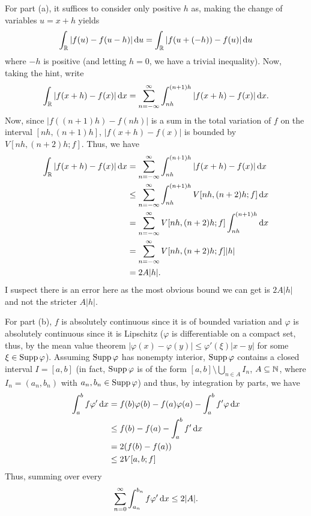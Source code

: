 \begin{solution}
  For part (a), it suffices to consider only positive \(h\) as, making the
  change of variables \(u=x+h\) yields
  \[
    \int_{\mathbb{R}} |f(u)-f(u-h)|\mathop{}\!\mathrm{d} u=
    \int_{\mathbb{R}} |f(u+(-h))-f(u)|\mathop{}\!\mathrm{d} u
  \]
  where \(-h\) is positive (and letting \(h=0\), we have a trivial
  inequality). Now, taking the hint, write
  \[
    \int_{\bbR} |f(x+h)-f(x)|\diff x=%
    \sum_{n=-\infty}^\infty\int_{nh}^{(n+1)h}|f(x+h)-f(x)|\diff x.
  \]
  Now, since \(|f((n+1)h)-f(nh)|\) is a sum in the total variation of \(f\)
  on the interval \([nh,(n+1)h]\), \(|f(x+h)-f(x)|\) is bounded by
  \(V[nh,(n+2)h;f]\). Thus, we have
  \begin{align*}
    \int_{\mathbb{R}} |f(x+h)-f(x)|\mathop{}\!\mathrm{d} x
    &=\sum_{n=-\infty}^\infty\int_{nh}^{(n+1)h}|f(x+h)-f(x)|\mathop{}\!\mathrm{d} x\\
    &\leq\sum_{n=-\infty}^\infty\int_{nh}^{(n+1)h}V[nh,(n+2)h;f]\mathop{}\!\mathrm{d} x\\
    &=\sum_{n=-\infty}^\infty V[nh,(n+2)h;f]\int_{nh}^{(n+1)h}\mathop{}\!\mathrm{d} x\\
    &=\sum_{n=-\infty}^\infty V[nh,(n+2)h;f]|h|\\
    &=2A|h|.
  \end{align*}
  I suspect there is an error here as the most obvious bound we can get is
  \(2A|h|\) and not the stricter \(A|h|\).

  For part (b), \(f\) is absolutely continuous since it is of bounded
  variation and \(\varphi\) is absolutely continuous since it is Lipschitz
  (\(\varphi\) is differentiable on a compact set, thus, by the mean value
  theorem \(|\varphi(x)-\varphi(y)|\leq \varphi'(\xi)|x-y|\) for some
  \(\xi\in\operatorname{Supp}\varphi\)). Assuming \(\operatorname{Supp}\varphi\) has nonempty interior,
  \(\operatorname{Supp}\varphi\) contains a closed interval \(I=[a,b]\) (in fact,
  \(\operatorname{Supp}\varphi\) is of the form \([a,b]\setminus\bigcup_{n\in A} I_n\),
  \(A\subseteq\mathbb{N}\), where \(I_n=(a_n,b_n)\) with
  \(a_n,b_n\in\operatorname{Supp}\varphi\)) and thus, by integration by parts, we have
  \begin{align*}
    \int_a^b f\varphi'\diff x%
    &=f(b)\varphi(b)-f(a)\varphi(a)
      -\int_a^b f'\varphi\diff x\\
    &\leq f(b)-f(a)
      -\int_a^b f'\diff x\\
    &=2(f(b)-f(a))\\
    &\leq 2V[a,b;f]
  \end{align*}
  Thus, summing over every
  \[
    \sum_{n=0}^\infty \int_{a_n}^{b_n} f\varphi'\mathop{}\!\mathrm{d} x\leq 2|A|.
  \]
\end{solution}

